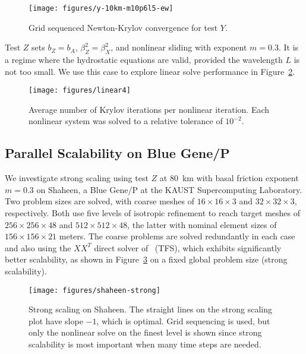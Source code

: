 \documentclass[3p]{elsarticle}
\begin{document}
\begin{figure}
  \texttt{[image: figures/y-10km-m10p6l5-ew]}
  \centering\caption{Grid sequenced Newton-Krylov convergence for test $Y$.}\label{fig:testy}
\end{figure}

Test $Z$ sets $b_Z = b_A$, $\beta_Z^2 = \beta_X^2$, and nonlinear sliding with exponent $m=0.3$. It is a regime where the hydrostatic equations are valid, provided the wavelength $L$ is not too small.  We use this case to explore linear solve performance in Figure~\ref{fig:linear}.

\begin{figure}
  \texttt{[image: figures/linear4]}
  \centering\caption{Average number of Krylov iterations per nonlinear iteration.  Each nonlinear system was solved to a relative tolerance of $10^{-2}$.}\label{fig:linear}
\end{figure}

\subsection{Parallel Scalability on Blue Gene/P}\label{sec:pscaling}
We investigate strong scaling using test $Z$ at \SI{80}{\kilo\metre} with basal friction exponent $m= 0.3$ on Shaheen, a Blue Gene/P at the KAUST Supercomputing Laboratory.  Two problem sizes are solved, with coarse meshes of $16\times 16\times 3$ and $32\times 32\times 3$, respectively.  Both use five levels of isotropic refinement to reach target meshes of $256\times 256\times 48$ and $512\times 512\times 48$, the latter with nominal element sizes of $156\times 156\times 21$ meters.  The coarse problems are solved redundantly in each case and also using the $XX^T$ direct solver of~\cite{tufo2001fast} (TFS), which exhibits significantly better scalability, as shown in Figure~\ref{fig:shaheen-strong} on a fixed global problem size (strong scalability).

\begin{figure}
  \texttt{[image: figures/shaheen-strong]}
  \centering\caption{Strong scaling on Shaheen.
    The straight lines on the strong scaling plot have slope $-1$, which is optimal.
    Grid sequencing is used, but only the nonlinear solve on the finest level is shown since strong scalability is most important when many time steps are needed.}\label{fig:shaheen-strong}
\end{figure}
\end{document}

